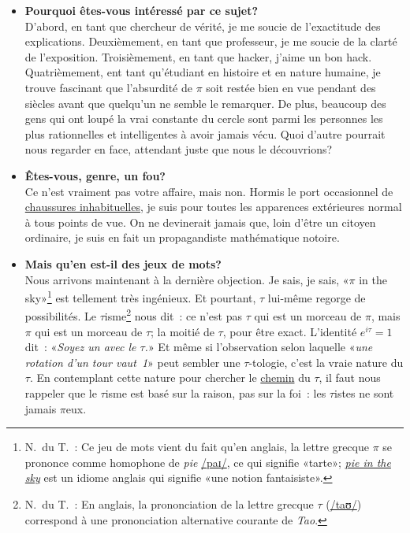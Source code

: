 \begin{itemize}
  \item \textbf{Pourquoi êtes-vous intéressé par ce sujet\ns?} \\ D'abord, en
  tant que chercheur de vérité, je me soucie de l'exactitude des explications.
  Deuxièmement, en tant que professeur, je me soucie de la clarté de
  l'exposition. Troisièmement, en tant que hacker, j'aime un bon hack.
  Quatrièmement, ent tant qu'étudiant en histoire et en nature humaine, je
  trouve fascinant que l'absurdité de $\pi$ soit restée bien en vue pendant des
  siècles avant que quelqu'un ne semble le remarquer. De plus, beaucoup des gens
  qui ont loupé la vrai constante du cercle sont parmi les personnes les plus
  rationnelles et intelligentes à avoir jamais vécu. Quoi d'autre pourrait nous
  regarder en face, attendant juste que nous le découvrions\ns?

  \item \textbf{Êtes-vous, genre, un fou\ns?} \\ Ce n'est vraiment pas votre
  affaire, mais non. Hormis le port occasionnel de
  \href{https://fr.wikipedia.org/wiki/Chaussure_à_orteils}{chaussures
  inhabituelles}, je suis pour toutes les apparences extérieures normal à tous
  points de vue. On ne devinerait jamais que, loin d'être un citoyen ordinaire,
  je suis en fait un propagandiste mathématique notoire.

  \item \textbf{Mais qu'en est-il des jeux de mots\ns?} \\ Nous arrivons
  maintenant à la dernière objection. Je sais, je sais,
  «\ns $\pi$ in the sky\ns »\ns\footnote{N.\ du T.~: Ce jeu de mots vient du fait
  qu'en anglais, la lettre grecque $\pi$ se prononce comme homophone de
  \emph{pie}
  \href{https://fr.wikipedia.org/wiki/Alphabet_phonétique_international}{/paɪ/},
  ce qui signifie «\ns tarte\ns »\ns;
  \href{https://en.wiktionary.org/wiki/pie_in_the_sky}{\emph{pie in the sky}}
  est un idiome anglais qui signifie «\ns une notion fantaisiste\ns ».} est
  tellement très ingénieux. Et pourtant, $\tau$ lui-même regorge de
  possibilités. Le $\tau$isme\ns\footnote{N.\ du T.~: En anglais, la
  prononciation de la lettre grecque $\tau$ (\href{https://en.wiktionary.org/wiki/pie_in_the_sky}{/taʊ/}) correspond à une prononciation alternative courante de \emph{Tao}.} nous dit~:
  ce n'est pas $\tau$ qui est un morceau de $\pi$, mais $\pi$ qui est un morceau
  de $\tau$\ns; la moitié de $\tau$, pour être exact. L'identité $e^{i\tau} = 1$
  dit~: «\ns \emph{Soyez un avec le $\tau$.}\ns » Et même si l'observation selon
  laquelle «\ns \emph{une rotation d'un tour vaut~1}\ns » peut sembler une
  $\tau$-tologie, c'est la vraie nature du $\tau$. En contemplant cette nature
  pour chercher le \href{https://fr.wikipedia.org/wiki/Tao_(culture)}{chemin} du
  $\tau$, il faut nous rappeler que le $\tau$isme est basé sur la raison, pas
  sur la foi~: les $\tau$istes ne sont jamais $\pi$eux.

\end{itemize}


